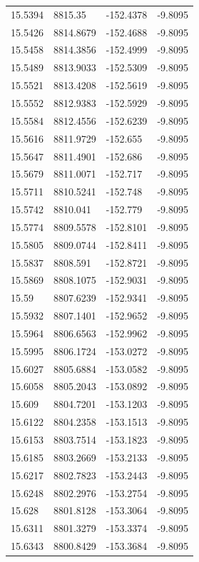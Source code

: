 \begin{table}[H]
\begin{tabular}{llll}
15.5394 & 8815.35 & -152.4378 & -9.8095 \\
15.5426 & 8814.8679 & -152.4688 & -9.8095 \\
15.5458 & 8814.3856 & -152.4999 & -9.8095 \\
15.5489 & 8813.9033 & -152.5309 & -9.8095 \\
15.5521 & 8813.4208 & -152.5619 & -9.8095 \\
15.5552 & 8812.9383 & -152.5929 & -9.8095 \\
15.5584 & 8812.4556 & -152.6239 & -9.8095 \\
15.5616 & 8811.9729 & -152.655 & -9.8095 \\
15.5647 & 8811.4901 & -152.686 & -9.8095 \\
15.5679 & 8811.0071 & -152.717 & -9.8095 \\
15.5711 & 8810.5241 & -152.748 & -9.8095 \\
15.5742 & 8810.041 & -152.779 & -9.8095 \\
15.5774 & 8809.5578 & -152.8101 & -9.8095 \\
15.5805 & 8809.0744 & -152.8411 & -9.8095 \\
15.5837 & 8808.591 & -152.8721 & -9.8095 \\
15.5869 & 8808.1075 & -152.9031 & -9.8095 \\
15.59 & 8807.6239 & -152.9341 & -9.8095 \\
15.5932 & 8807.1401 & -152.9652 & -9.8095 \\
15.5964 & 8806.6563 & -152.9962 & -9.8095 \\
15.5995 & 8806.1724 & -153.0272 & -9.8095 \\
15.6027 & 8805.6884 & -153.0582 & -9.8095 \\
15.6058 & 8805.2043 & -153.0892 & -9.8095 \\
15.609 & 8804.7201 & -153.1203 & -9.8095 \\
15.6122 & 8804.2358 & -153.1513 & -9.8095 \\
15.6153 & 8803.7514 & -153.1823 & -9.8095 \\
15.6185 & 8803.2669 & -153.2133 & -9.8095 \\
15.6217 & 8802.7823 & -153.2443 & -9.8095 \\
15.6248 & 8802.2976 & -153.2754 & -9.8095 \\
15.628 & 8801.8128 & -153.3064 & -9.8095 \\
15.6311 & 8801.3279 & -153.3374 & -9.8095 \\
15.6343 & 8800.8429 & -153.3684 & -9.8095 \\

\end{tabular}
\end{table}

